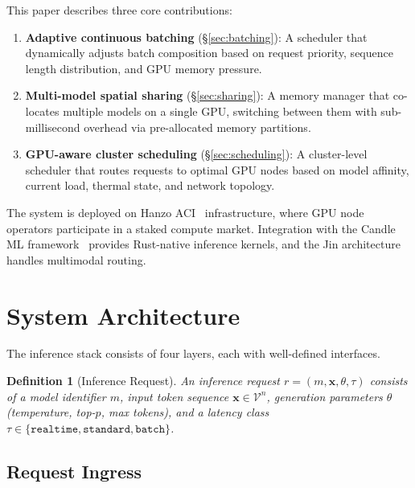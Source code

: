 \documentclass[11pt]{article}
\newtheorem{definition}{Definition}
\begin{document}
This paper describes three core contributions:
\begin{enumerate}[leftmargin=1.4em]
    \item \textbf{Adaptive continuous batching} (\S\ref{sec:batching}): A
    scheduler that dynamically adjusts batch composition based on request
    priority, sequence length distribution, and GPU memory pressure.
    \item \textbf{Multi-model spatial sharing} (\S\ref{sec:sharing}): A memory
    manager that co-locates multiple models on a single GPU, switching between
    them with sub-millisecond overhead via pre-allocated memory partitions.
    \item \textbf{GPU-aware cluster scheduling} (\S\ref{sec:scheduling}): A
    cluster-level scheduler that routes requests to optimal GPU nodes based on
    model affinity, current load, thermal state, and network topology.
\end{enumerate}

The system is deployed on Hanzo ACI~\cite{hanzoaci} infrastructure, where GPU
node operators participate in a staked compute market. Integration with the
Candle ML framework~\cite{hanzocandle} provides Rust-native inference kernels,
and the Jin architecture~\cite{hanzojin} handles multimodal routing.

\section{System Architecture}
\label{sec:arch}

The inference stack consists of four layers, each with well-defined interfaces.

\begin{definition}[Inference Request]
An inference request $r = (m, \mathbf{x}, \theta, \tau)$ consists of a model
identifier $m$, input token sequence $\mathbf{x} \in \mathcal{V}^n$,
generation parameters $\theta$ (temperature, top-$p$, max tokens), and a
latency class $\tau \in \{\texttt{realtime}, \texttt{standard}, \texttt{batch}\}$.
\end{definition}

\subsection{Request Ingress}
\end{document}
